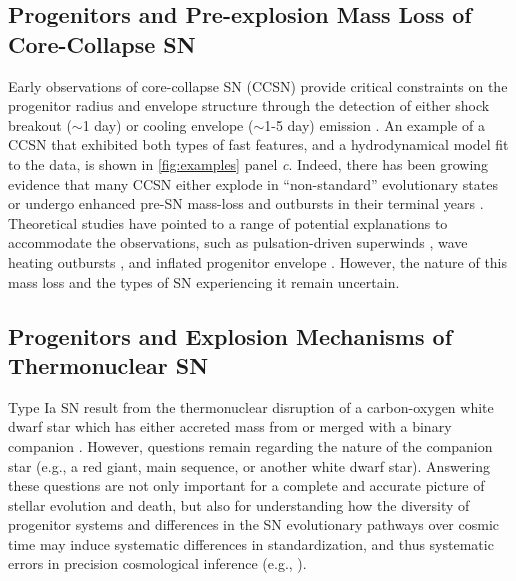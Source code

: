 \documentclass[letterpaper,longauthor,trackchanges,twocolumn,onecolappendix,sort&compress]{aastex62}
\begin{document}

\subsection{Progenitors and Pre-explosion Mass Loss of Core-Collapse SN} 

Early observations of core-collapse SN (CCSN) provide critical constraints on the progenitor radius and envelope structure through the detection of either shock breakout ($\sim$1 day) or cooling envelope ($\sim$1-5 day) emission \citep{Modjaz2009,Nakar2010,Arcavi2011,Bersten2018}. An example of a CCSN that exhibited both types of fast features, and a hydrodynamical model fit to the data, is shown in \autoref{fig:examples} panel \emph{c}. Indeed, there has been growing evidence that many CCSN either explode in ``non-standard'' evolutionary states or undergo enhanced pre-SN mass-loss and outbursts in their terminal years \citep{Khazov2016,Nakar2014}. Theoretical studies have pointed to a range of potential explanations to accommodate the observations, such as pulsation-driven superwinds \citep{Yoon2010}, wave heating outbursts \citep{Fuller2017}, and inflated progenitor envelope \citep{Grafener2012}. However, the nature of this mass loss and the types of SN experiencing it remain uncertain.

\subsection{Progenitors and Explosion Mechanisms of Thermonuclear SN}

Type Ia SN result from the thermonuclear disruption of a carbon-oxygen white dwarf star which has either accreted mass from or merged with a binary companion \citep{Hillebrandt2000}. However, questions remain regarding the nature of the companion star (e.g., a red giant, main sequence, or another white dwarf star). Answering these questions are not only important for a complete and accurate picture of stellar evolution and death, but also for understanding how the diversity of progenitor systems and differences in the SN evolutionary pathways over cosmic time may induce systematic differences in standardization, and thus systematic errors in precision cosmological inference (e.g., \citealt{2011PhDT........37D,2013PhDT.......326H}).
\end{document}
